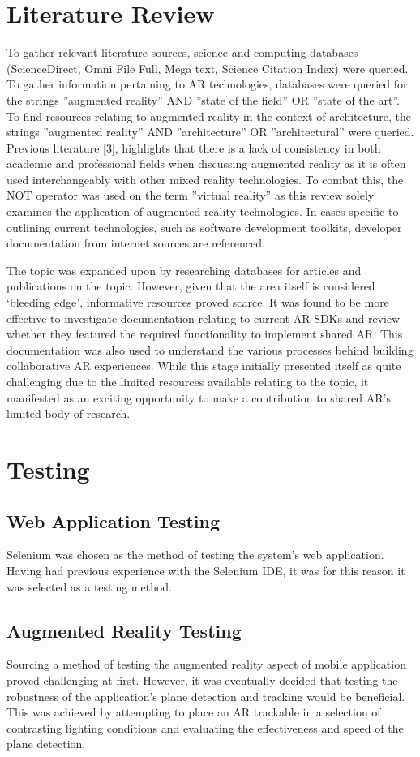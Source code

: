 \section{Literature Review}
To gather relevant literature sources, science and computing databases (ScienceDirect, Omni File Full, Mega text, Science Citation Index) were queried. To gather information pertaining to AR technologies, databases were queried for the strings ”augmented reality” AND ”state of the field” OR ”state of the art”. To find resources relating to augmented reality in the context of architecture, the strings ”augmented reality” AND ”architecture” OR ”architectural” were queried. Previous literature [3], highlights that there is a lack of consistency in both academic and professional fields when discussing augmented reality as it is often used interchangeably with other mixed reality technologies. To combat this, the NOT operator was used on the term ”virtual reality” as this review solely examines the application of augmented reality technologies. In cases specific to outlining current technologies, such as software development toolkits, developer documentation from internet sources are referenced.

The topic was expanded upon by researching databases for articles and publications on the topic. However, given that the area itself is considered ‘bleeding edge’, informative resources proved scarce. It was found to be more effective to investigate documentation relating to current AR SDKs and review whether they featured the required functionality to implement shared AR. This documentation was also used to understand the various processes behind building collaborative AR experiences.  While this stage initially presented itself as quite challenging due to the limited resources available relating to the topic, it manifested as an exciting opportunity to make a contribution to shared AR’s limited body of research.

\section{Testing}
\subsection{Web Application Testing}
Selenium was chosen as the method of testing the system's web application. Having had previous experience with the Selenium IDE, it was for this reason it was selected as a testing method.
\subsection{Augmented Reality Testing}
Sourcing a method of testing the augmented reality aspect of mobile application proved challenging at first. However, it was eventually decided that testing the robustness of the application's plane detection and tracking would be beneficial. This was achieved by attempting to place an AR trackable in a selection of contrasting lighting conditions and evaluating the effectiveness and speed of the plane detection. 




